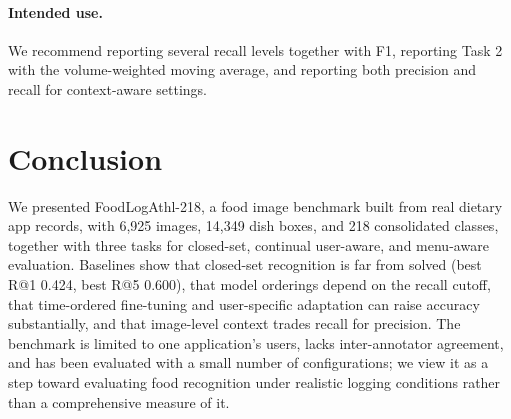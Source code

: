 \documentclass[sigconf, nonacm]{acmart}
\begin{document}
\paragraph{Intended use.} We recommend reporting several recall levels together with F1, reporting Task 2 with the volume-weighted moving average, and reporting both precision and recall for context-aware settings.

\section{Conclusion}
We presented FoodLogAthl-218, a food image benchmark built from real dietary app records, with 6,925 images, 14,349 dish boxes, and 218 consolidated classes, together with three tasks for closed-set, continual user-aware, and menu-aware evaluation. Baselines show that closed-set recognition is far from solved (best R@1 0.424, best R@5 0.600), that model orderings depend on the recall cutoff, that time-ordered fine-tuning and user-specific adaptation can raise accuracy substantially, and that image-level context trades recall for precision. The benchmark is limited to one application's users, lacks inter-annotator agreement, and has been evaluated with a small number of configurations; we view it as a step toward evaluating food recognition under realistic logging conditions rather than a comprehensive measure of it.

\label{endtext}



\end{document}
